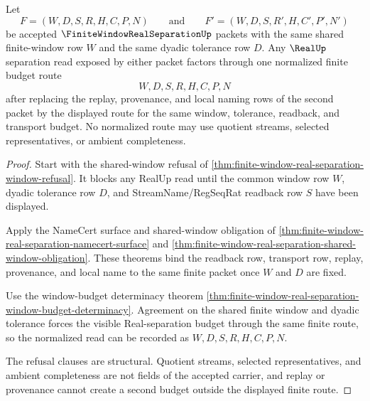 \begin{theorem}
\label{thm:finite-window-real-separation-shared-budget-normalization}
Let
$$
F=(W,D,S,R,H,C,P,N)
\qquad\text{and}\qquad
F'=(W,D,S,R',H,C',P',N')
$$
be accepted $\FiniteWindowRealSeparationUp$ packets with the same shared finite-window row $W$ and the same dyadic tolerance row $D$. Any $\RealUp$ separation read exposed by either packet factors through one normalized finite budget route
$$
W,D,S,R,H,C,P,N
$$
after replacing the replay, provenance, and local naming rows of the second packet by the displayed route for the same window, tolerance, readback, and transport budget. No normalized route may use quotient streams, selected representatives, or ambient completeness.
\end{theorem}
\begin{proof}
Start with the shared-window refusal of \autoref{thm:finite-window-real-separation-window-refusal}. It blocks any RealUp read until the common window row $W$, dyadic tolerance row $D$, and StreamName/RegSeqRat readback row $S$ have been displayed.

Apply the NameCert surface and shared-window obligation of \autoref{thm:finite-window-real-separation-namecert-surface} and \autoref{thm:finite-window-real-separation-shared-window-obligation}. These theorems bind the readback row, transport row, replay, provenance, and local name to the same finite packet once $W$ and $D$ are fixed.

Use the window-budget determinacy theorem \autoref{thm:finite-window-real-separation-window-budget-determinacy}. Agreement on the shared finite window and dyadic tolerance forces the visible Real-separation budget through the same finite route, so the normalized read can be recorded as $W,D,S,R,H,C,P,N$.

The refusal clauses are structural. Quotient streams, selected representatives, and ambient completeness are not fields of the accepted carrier, and replay or provenance cannot create a second budget outside the displayed finite route.
\end{proof}

